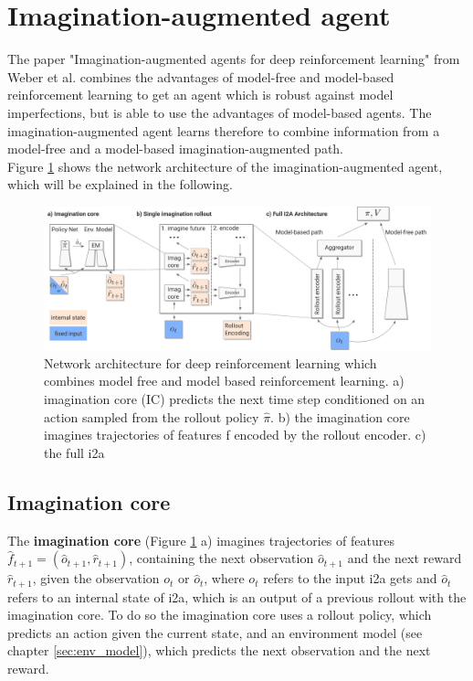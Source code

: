 \section{Imagination-augmented agent} 
\label{sec:i2a} 
 
The paper "Imagination-augmented agents for deep reinforcement learning" from Weber et al. \cite{I2A} combines the advantages of model-free and model-based reinforcement learning to get an agent which is robust against model imperfections, but is able to use the advantages of model-based agents.
The imagination-augmented agent learns therefore to combine information from a model-free and a model-based imagination-augmented path.\\
 
Figure \ref{fig:i2a_architecture} shows the network architecture of the imagination-augmented agent, which will be explained in the following.

\begin{figure}[H] 
  \centering 
   
  \includegraphics[width=\columnwidth]{./Images/i2a_architecture.pdf} 
  \caption{Network architecture for deep reinforcement learning which combines model free and model based reinforcement learning. a) imagination core (IC) predicts the next time step conditioned on an action sampled from the rollout policy $\hat{\pi}$. b) the imagination core imagines trajectories of features f encoded by the rollout encoder. c) the full i2a} 
  \label{fig:i2a_architecture} 
\end{figure}

 
\subsection{Imagination core}


The \textbf{imagination core} (Figure \ref{fig:i2a_architecture} a) imagines trajectories of features $\hat{f}_{t+1} = (\hat{o}_{t+1}, \hat{r}_{t+1})$, containing the next observation $\hat{o}_{t+1}$ and the next reward $\hat{r}_{t+1}$, given the observation $o_t$ or $\hat{o}_{t}$, where $o_t$ refers to the input i2a gets and $\hat{o}_{t}$ refers to an internal state of i2a, which is an output of a previous rollout with the imagination core.
To do so the imagination core uses a rollout policy, which predicts an action given the current state, and an environment model (see chapter \ref{sec:env_model}), which predicts the next observation and the next reward.\\


